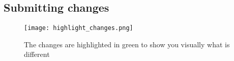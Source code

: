 \documentclass[11pt]{article}
\begin{document}
\subsection{Submitting changes  }

\begin{figure}[ht]
     \centering
     \texttt{[image: highlight\_changes.png]}
     \caption[The changes are highlighted in green to show you visually what is different]{The changes are highlighted in green to show you visually what is different}
     \label{fig:highlight_changes}
\end{figure}
\end{document}
